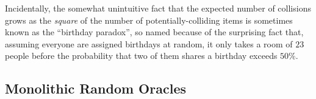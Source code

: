     Incidentally, the somewhat unintuitive fact that the expected number of
      collisions grows as the \emph{square} of the number of
      potentially-colliding items
      is sometimes known as the ``birthday paradox'', so named because 
      of the surprising fact that, assuming everyone are assigned birthdays at
      random, it only takes a room of $23$ people before the
      probability that two of them shares a birthday exceeds $50\%$.
      
  \subsection{Monolithic Random Oracles}
    \begin{figure}[t]
      \centering
      \fbox{
        \begin{minipage}[t][1.3cm]{2.3cm}
    	  	\underline{\initHeading $\RO$}
          \smallskip
        	\nicoresetlinenr
    	  	\begin{nicodemus}
            \item $\Db \assign (\emptystring, \emptystring)$ 
            \smallskip
            \item $\pcreturn \done$
    	  	\end{nicodemus}	
    	  \end{minipage}
    
}
\end{figure}
